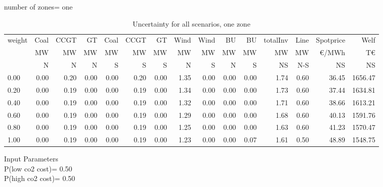 \documentclass[landscape]{article}
\begin{document}
number of zones= one\\
\begin{table}[htb]\caption{Uncertainty for all scenarios, one zone}
\begin{tabular}{l|rrrrrr|rr|rr|rr|rr}
\toprule
 weight &    Coal &     CCGT &      GT &   Coal  &   CCGT &      GT &    Wind &    Wind  &  BU  &  BU  & totalInv  &    Line   &  Spotprice   &  Welf   \\
        &      MW &       MW &      MW &      MW &     MW &      MW &      MW &      MW  &  MW  &  MW  &    MW     &    MW     &  \euro/MWh &  T\euro   \\
        &       N &       N  &      N  &      S  &      S &       S &       N &       S  &  N   &  S   &    NS     &    N-S    &  NS      &   NS    \\
\midrule
        0.00&        0.00&        0.20&        0.00&        0.00&        0.20&        0.00&        1.35&        0.00&        0.00&        0.00&        1.74&        0.60&       36.45&     1656.47\\
        0.20&        0.00&        0.19&        0.00&        0.00&        0.19&        0.00&        1.34&        0.00&        0.00&        0.00&        1.73&        0.60&       37.44&     1634.81\\
        0.40&        0.00&        0.19&        0.00&        0.00&        0.19&        0.00&        1.32&        0.00&        0.00&        0.00&        1.71&        0.60&       38.66&     1613.21\\
        0.60&        0.00&        0.19&        0.00&        0.00&        0.19&        0.00&        1.29&        0.00&        0.00&        0.00&        1.68&        0.60&       40.13&     1591.76\\
        0.80&        0.00&        0.19&        0.00&        0.00&        0.19&        0.00&        1.25&        0.00&        0.00&        0.00&        1.63&        0.60&       41.23&     1570.47\\
        1.00&        0.00&        0.19&        0.00&        0.00&        0.19&        0.00&        1.23&        0.00&        0.00&        0.07&        1.61&        0.50&       48.89&     1548.75\\
\bottomrule
\end{tabular}
\end{table}
\clearpage
\noindent
Input Parameters\\
P(low co2 cost)=         0.50\\
P(high co2 cost)=         0.50\\
\end{document}
